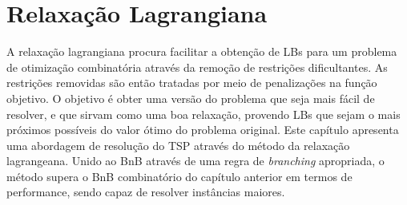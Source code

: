 \chapter{Relaxação Lagrangiana}
A relaxação lagrangiana procura facilitar a obtenção de LBs para um problema de otimização combinatória através da remoção de restrições dificultantes. As restrições removidas são então tratadas por meio de penalizações na função objetivo. O objetivo é obter uma versão do problema que seja mais fácil de resolver, e que sirvam como uma boa relaxação, provendo LBs que sejam o mais próximos possíveis do valor ótimo do problema original. Este capítulo apresenta uma abordagem de resolução do TSP através do método da relaxação lagrangeana. Unido ao BnB através de uma regra de \textit{branching} apropriada, o método supera o BnB combinatório do capítulo anterior em termos de performance, sendo capaz de resolver instâncias maiores.


